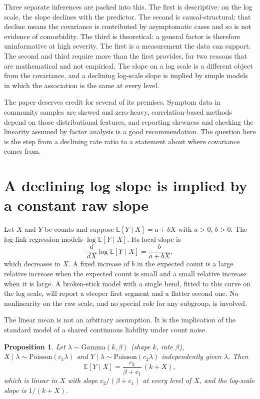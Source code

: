 \documentclass[11pt]{article}
\newtheorem{proposition}{Proposition}
\theoremstyle{definition}
\newcommand{\E}{\mathbb{E}}
\begin{document}
Three separate inferences are packed into this. The first is descriptive: on the log scale, the slope declines with the predictor. The second is causal-structural: that decline means the covariance is contributed by asymptomatic cases and so is not evidence of comorbidity. The third is theoretical: a general factor is therefore uninformative at high severity. The first is a measurement the data can support. The second and third require more than the first provides, for two reasons that are mathematical and not empirical. The slope on a log scale is a different object from the covariance, and a declining log-scale slope is implied by simple models in which the association is the same at every level.

The paper deserves credit for several of its premises. Symptom data in community samples are skewed and zero-heavy, correlation-based methods depend on those distributional features, and reporting skewness and checking the linearity assumed by factor analysis is a good recommendation. The question here is the step from a declining rate ratio to a statement about where covariance comes from.

\section{A declining log slope is implied by a constant raw slope}
\label{sec:scale}

Let $X$ and $Y$ be counts and suppose $\E[Y\mid X]=a+bX$ with $a>0$, $b>0$. The log-link regression models $\log\E[Y\mid X]$. Its local slope is
\begin{equation}
\frac{d}{dX}\log\E[Y\mid X]=\frac{b}{a+bX},
\label{eq:logslope}
\end{equation}
which decreases in $X$. A fixed increase of $b$ in the expected count is a large relative increase when the expected count is small and a small relative increase when it is large. A broken-stick model with a single bend, fitted to this curve on the log scale, will report a steeper first segment and a flatter second one. No nonlinearity on the raw scale, and no special role for any subgroup, is involved.

The linear mean is not an arbitrary assumption. It is the implication of the standard model of a shared continuous liability under count noise.

\begin{proposition}
Let $\lambda\sim\mathrm{Gamma}(k,\beta)$ (shape $k$, rate $\beta$), $X\mid\lambda\sim\mathrm{Poisson}(c_1\lambda)$ and $Y\mid\lambda\sim\mathrm{Poisson}(c_2\lambda)$ independently given $\lambda$. Then
\begin{equation}
\E[Y\mid X]=\frac{c_2}{\beta+c_1}\,(k+X),
\end{equation}
which is linear in $X$ with slope $c_2/(\beta+c_1)$ at every level of $X$, and the log-scale slope is $1/(k+X)$.
\end{proposition}
\end{document}
